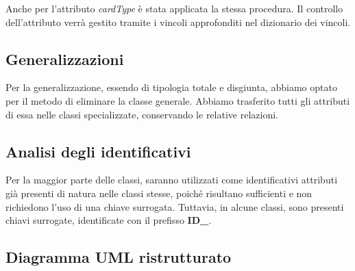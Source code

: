 Anche per l'attributo \textit{cardType} è stata applicata la stessa
procedura. Il controllo dell'attributo verrà gestito tramite i vincoli
approfonditi nel dizionario dei vincoli.

\subsection{Generalizzazioni}

Per la generalizzazione, essendo di tipologia totale e disgiunta,
abbiamo optato per il metodo di eliminare la classe generale.
Abbiamo trasferito tutti gli attributi di essa nelle
classi specializzate, conservando le relative relazioni.

\subsection{Analisi degli identificativi}

Per la maggior parte delle classi, saranno utilizzati come identificativi
attributi già presenti di natura nelle classi stesse, poiché risultano
sufficienti e non richiedono l'uso di una chiave surrogata.
Tuttavia, in alcune classi, sono presenti chiavi surrogate,
identificate con il prefisso \textbf{ID\_}.

\newpage
\subsection{Diagramma UML ristrutturato}

